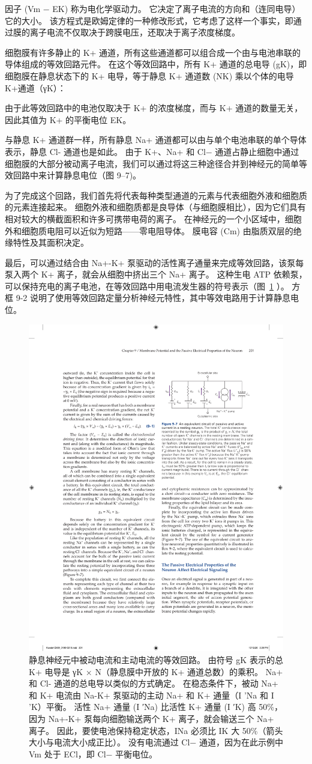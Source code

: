 因子 (Vm − EK) 称为电化学驱动力。
它决定了离子电流的方向和（连同电导）它的大小。
该方程式是欧姆定律的一种修改形式，它考虑了这样一个事实，即通过膜的离子电流不仅取决于跨膜电压，还取决于离子浓度梯度。


细胞膜有许多静止的 K+ 通道，所有这些通道都可以组合成一个由与电池串联的导体组成的等效回路元件。
在这个等效回路中，所有 K+ 通道的总电导 (gK)，即细胞膜在静息状态下的 K+ 电导，等于静息 K+ 通道数 (NK) 乘以个体的电导 K+通道（γK）：


由于此等效回路中的电池仅取决于 K+ 的浓度梯度，而与 K+ 通道的数量无关，因此其值为 K+ 的平衡电位 EK。


与静息 K+ 通道群一样，所有静息 Na+ 通道都可以由与单个电池串联的单个导体表示，静息 Cl- 通道也是如此。
由于 K+、Na+ 和 Cl− 通道占静止细胞中通过细胞膜的大部分被动离子电流，我们可以通过将这三种途径合并到神经元的简单等效回路中来计算静息电位（图 9–7)。


为了完成这个回路，我们首先将代表每种类型通道的元素与代表细胞外液和细胞质的元素连接起来。
细胞外液和细胞质都是良导体（与细胞膜相比），因为它们具有相对较大的横截面积和许多可携带电荷的离子。
在神经元的一个小区域中，细胞外和细胞质电阻可以近似为短路——零电阻导体。
膜电容 (Cm) 由脂质双层的绝缘特性及其面积决定。


最后，可以通过结合由 Na+-K+ 泵驱动的活性离子通量来完成等效回路，该泵每泵入两个 K+ 离子，就会从细胞中挤出三个 Na+ 离子。
这种生电 ATP 依赖泵，可以保持充电的离子电池，在等效回路中用电流发生器的符号表示（图~\ref{fig:9_7} ）。
方框 9-2 说明了使用等效回路定量分析神经元特性，其中等效电路用于计算静息电位。


\begin{figure}[htbp]
	\centering
	\includegraphics[width=0.5\linewidth]{chap09/fig_9_7}
	\caption{静息神经元中被动电流和主动电流的等效回路。 由符号 gK 表示的总 K+ 电导是 γK × N（静息膜中开放的 K+ 通道总数）的乘积。 Na+ 和 Cl- 通道的总电导以类似的方式确定。 在稳态条件下，被动 Na+ 和 K+ 电流由 Na-K+ 泵驱动的主动 Na+ 和 K+ 通量（I 'Na 和 I 'K）平衡。 活性 Na+ 通量 (I ′Na) 比活性 K+ 通量 (I ′K) 高 50\%，因为 Na+-K+ 泵每向细胞输送两个 K+ 离子，就会输送三个 Na+ 离子。 因此，要使电池保持稳定状态，INa 必须比 IK 大 50\%（箭头大小与电流大小成正比）。 没有电流通过 Cl− 通道，因为在此示例中 Vm 处于 ECl，即 Cl− 平衡电位。}
	\label{fig:9_7}
\end{figure}


